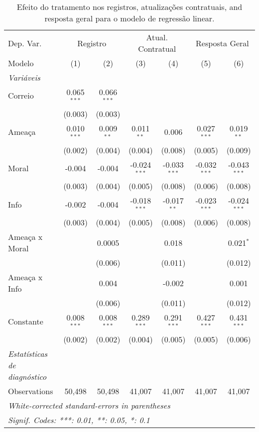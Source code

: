 \begin{table}[htbp]\centering
\caption{\label{tab:tab2} Efeito do tratamento nos registros, atualizações contratuais, and resposta geral para o modelo de regressão linear.}
\begin{tabular}{lcccccc}
\tabularnewline\toprule\toprule
Dep. Var.&\multicolumn{2}{c}{Registro}&\multicolumn{2}{c}{Atual. Contratual}&\multicolumn{2}{c}{Resposta Geral}\\
Modelo&(1) & (2) & (3) & (4) & (5) & (6)\\
\midrule
\emph{Variáveis}&  & & & & & \\
Correio&0.065$^{***}$&0.066$^{***}$&  &  &  &  \\
  &(0.003)&(0.003)&  &  &  &  \\
Ameaça&0.010$^{***}$&0.009$^{**}$&0.011$^{**}$&0.006&0.027$^{***}$&0.019$^{**}$\\
  &(0.002)&(0.004)&(0.004)&(0.008)&(0.005)&(0.009)\\
Moral&-0.004&-0.004&-0.024$^{***}$&-0.033$^{***}$&-0.032$^{***}$&-0.043$^{***}$\\
  &(0.003)&(0.004)&(0.005)&(0.008)&(0.006)&(0.008)\\
Info&-0.002&-0.004&-0.018$^{***}$&-0.017$^{**}$&-0.023$^{***}$&-0.024$^{***}$\\
  &(0.003)&(0.004)&(0.005)&(0.008)&(0.006)&(0.008)\\
Ameaça x Moral&  &0.0005&  &0.018&  &0.021$^{*}$\\
  &  &(0.006)&  &(0.011)&  &(0.012)\\
Ameaça x Info&  &0.004&  &-0.002&  &0.001\\
  &  &(0.006)&  &(0.011)&  &(0.012)\\
Constante&0.008$^{***}$&0.008$^{***}$&0.289$^{***}$&0.291$^{***}$&0.427$^{***}$&0.431$^{***}$\\
  &(0.002)&(0.002)&(0.004)&(0.005)&(0.005)&(0.006)\\
\midrule
\emph{Estatísticas de diagnóstico}&  & & & & & \\
Observations& 50,498&50,498&41,007&41,007&41,007&41,007\\
\bottomrule\bottomrule
\multicolumn{7}{l}{\emph{White-corrected standard-errors in parentheses}}\\
\multicolumn{7}{l}{\emph{Signif. Codes: ***: 0.01, **: 0.05, *: 0.1}}\\
\end{tabular}
\end{table}